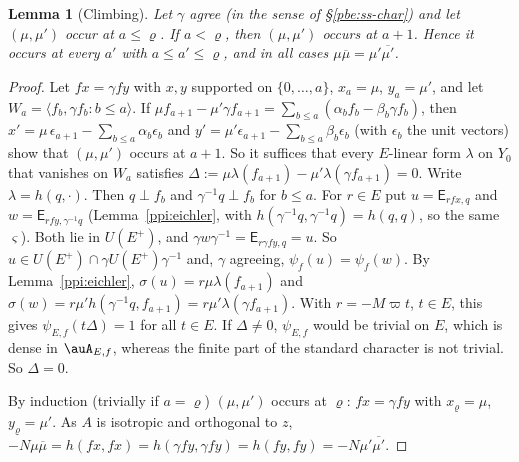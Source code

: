 \documentclass[10pt]{amsart}
\newtheorem{lemma}[theorem]{Lemma}
\theoremstyle{definition}
\theoremstyle{remark}
\providecommand{\aubar}[1]{\overline{#1}}
\begin{document}
\begin{lemma}[Climbing]\label{ppi:climb}
Let $\gamma$ agree (in the sense of \S\ref{pbe:ss-char}) and let $(\mu,\mu')$ occur at $a\le\varrho$. If $a<\varrho$, then $(\mu,\mu')$
occurs at $a+1$. Hence it occurs at every $a'$ with $a\le a'\le\varrho$, and in all cases
$\mu\aubar\mu=\mu'\aubar{\mu'}$.
\end{lemma}
\begin{proof}
Let $fx=\gamma fy$ with $x,y$ supported on $\{0,\dots,a\}$, $x_a=\mu$, $y_a=\mu'$, and let $W_a=\langle
f_b,\gamma f_b:b\le a\rangle$. If $\mu f_{a+1}-\mu'\gamma f_{a+1}=\sum_{b\le a}(\alpha_bf_b-\beta_b
\gamma f_b)$, then $x'=\mu\,\epsilon_{a+1}-\sum_{b\le a}\alpha_b\epsilon_b$ and $y'=\mu'\epsilon_{a+1}-
\sum_{b\le a}\beta_b\epsilon_b$ (with $\epsilon_b$ the unit vectors) show that $(\mu,\mu')$ occurs at
$a+1$. So it suffices that every $E$-linear form $\lambda$ on $Y_0$ that vanishes on $W_a$ satisfies
$\Delta:=\mu\lambda(f_{a+1})-\mu'\lambda(\gamma f_{a+1})=0$. Write $\lambda=h(q,\cdot)$. Then $q\perp
f_b$ and $\gamma^{-1}q\perp f_b$ for $b\le a$. For $r\in E$ put $u=\mathsf E_{rfx,q}$ and $w=\mathsf
E_{rfy,\gamma^{-1}q}$ (Lemma~\ref{ppi:eichler}, with $h(\gamma^{-1}q,\gamma^{-1}q)=h(q,q)$, so the same
$\varsigma$). Both lie in $U(E^+)$, and $\gamma w\gamma^{-1}=\mathsf E_{r\gamma fy,q}=u$. So $u\in
U(E^+)\cap\gamma U(E^+)\gamma^{-1}$ and, $\gamma$ agreeing, $\psi_f(u)=\psi_f(w)$. By
Lemma~\ref{ppi:eichler}, $\sigma(u)=r\mu\lambda(f_{a+1})$ and $\sigma(w)=r\mu'h(\gamma^{-1}q,f_{a+1})=
r\mu'\lambda(\gamma f_{a+1})$. With $r=-M\varpi t$, $t\in E$, this gives $\psi_{E,f}(t\Delta)=1$ for
all $t\in E$. If $\Delta\ne0$, $\psi_{E,f}$ would be trivial on $E$, which is dense in $\auA_{E,f}$,
whereas the finite part of the standard character is not trivial. So $\Delta=0$.

By induction (trivially if $a=\varrho$) $(\mu,\mu')$ occurs at $\varrho$: $fx=\gamma fy$ with $x_\varrho=\mu$, $y_\varrho=\mu'$.
As $A$ is isotropic and orthogonal to $z$, $-N\mu\aubar\mu=h(fx,fx)=h(\gamma fy,\gamma fy)=h(fy,fy)=
-N\mu'\aubar{\mu'}$.
\end{proof}
\end{document}
